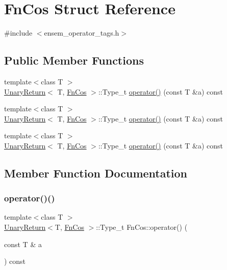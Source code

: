 \hypertarget{structFnCos}{}\section{Fn\+Cos Struct Reference}
\label{structFnCos}


{\ttfamily \#include $<$ensem\+\_\+operator\+\_\+tags.\+h$>$}

\subsection*{Public Member Functions}
\begin{DoxyCompactItemize}
\item 
{\footnotesize template$<$class T $>$ }\\\mbox{\hyperlink{structUnaryReturn}{Unary\+Return}}$<$ T, \mbox{\hyperlink{structFnCos}{Fn\+Cos}} $>$\+::Type\+\_\+t \mbox{\hyperlink{structFnCos_aaf33b1555b7687d8c211c90189ef0c5c}{operator()}} (const T \&a) const
\item 
{\footnotesize template$<$class T $>$ }\\\mbox{\hyperlink{structUnaryReturn}{Unary\+Return}}$<$ T, \mbox{\hyperlink{structFnCos}{Fn\+Cos}} $>$\+::Type\+\_\+t \mbox{\hyperlink{structFnCos_aaf33b1555b7687d8c211c90189ef0c5c}{operator()}} (const T \&a) const
\item 
{\footnotesize template$<$class T $>$ }\\\mbox{\hyperlink{structUnaryReturn}{Unary\+Return}}$<$ T, \mbox{\hyperlink{structFnCos}{Fn\+Cos}} $>$\+::Type\+\_\+t \mbox{\hyperlink{structFnCos_aaf33b1555b7687d8c211c90189ef0c5c}{operator()}} (const T \&a) const
\end{DoxyCompactItemize}


\subsection{Member Function Documentation}
\mbox{\label{structFnCos_aaf33b1555b7687d8c211c90189ef0c5c}} 
\subsubsection{\texorpdfstring{operator()()}{operator()()}\hspace{0.1cm}{\footnotesize\ttfamily [1/3]}}
{\footnotesize\ttfamily template$<$class T $>$ \\
\mbox{\hyperlink{structUnaryReturn}{Unary\+Return}}$<$T, \mbox{\hyperlink{structFnCos}{Fn\+Cos}} $>$\+::Type\+\_\+t Fn\+Cos\+::operator() (\begin{DoxyParamCaption}\item[{const T \&}]{a }\end{DoxyParamCaption}) const\hspace{0.3cm}{\ttfamily [inline]}}

